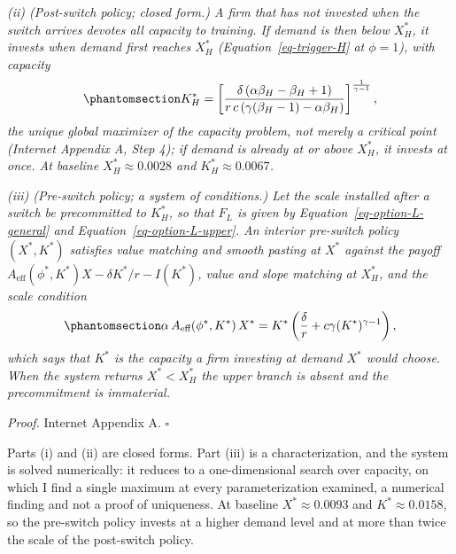 \documentclass[
  11pt,
  letterpaper,
]{scrartcl}
\begin{document}
\emph{(ii) (Post-switch policy; closed form.) A firm that has not
invested when the switch arrives devotes all capacity to training. If
demand is then below \(X_H^*\), it invests when demand first reaches
\(X_H^*\) (Equation~\ref{eq-trigger-H} at \(\phi = 1\)), with capacity}
\begin{equation}\protect\phantomsection\label{eq-K-H}{
K_H^* = \left[\frac{\delta\,(\alpha \beta_H - \beta_H + 1)}{r\,c\,(\gamma(\beta_H - 1) - \alpha \beta_H)}\right]^{\frac{1}{\gamma - 1}},
}\end{equation} \emph{the unique global maximizer of the capacity
problem, not merely a critical point (Internet Appendix A, Step 4); if
demand is already at or above \(X_H^*\), it invests at once. At baseline
\(X_H^* \approx 0.0028\) and \(K_H^* \approx 0.0067\).}

\emph{(iii) (Pre-switch policy; a system of conditions.) Let the scale
installed after a switch be precommitted to \(K_H^*\), so that \(F_L\)
is given by Equation~\ref{eq-option-L-general} and
Equation~\ref{eq-option-L-upper}. An interior pre-switch policy
\((X^*, K^*)\) satisfies value matching and smooth pasting at \(X^*\)
against the payoff
\(A_{\text{eff}}(\phi^*, K^*) X - \delta K^*/r - I(K^*)\), value and
slope matching at \(X_H^*\), and the scale condition}
\begin{equation}\protect\phantomsection\label{eq-scale-foc}{
\alpha\, A_{\text{eff}}(\phi^*, K^*)\, X^* = K^* \left(\frac{\delta}{r} + c \gamma (K^*)^{\gamma - 1}\right),
}\end{equation} \emph{which says that \(K^*\) is the capacity a firm
investing at demand \(X^*\) would choose. When the system returns
\(X^* < X_H^*\) the upper branch is absent and the precommitment is
immaterial.}

\emph{Proof.} Internet Appendix A. \(\square\)

Parts (i) and (ii) are closed forms. Part (iii) is a characterization,
and the system is solved numerically: it reduces to a one-dimensional
search over capacity, on which I find a single maximum at every
parameterization examined, a numerical finding and not a proof of
uniqueness. At baseline \(X^* \approx 0.0093\) and
\(K^* \approx 0.0158\), so the pre-switch policy invests at a higher
demand level and at more than twice the scale of the post-switch policy.
\end{document}
